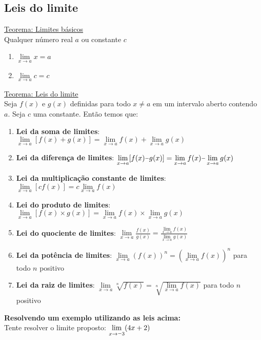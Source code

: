 \documentclass[12pt,a4paper,brazil]{article}
\newcommand{\minus}{\scalebox{0.75}[1.0]{$-$}}
\begin{document}
\subsection{\textbf{Leis do limite}}
\underline{Teorema: Limites básicos} \\
Qualquer número real $a$ ou constante $c$
\begin{center}
	\begin{enumerate}
		\item $\lim\limits_{x \to a} x = a$
		\item $\lim\limits_{x \to a} c = c$
	\end{enumerate}
\end{center}
\underline{Teorema: Leis do limite} \\
Seja $f(x)$ e $g(x)$ definidas para todo $x \neq a$ em um intervalo aberto contendo $a$.
Seja $c$ uma constante. Então temos que:
\begin{center}
	\begin{enumerate}
		\item \textbf{Lei da soma de limites}:
			$\lim\limits_{x \to a} [f(x) + g(x)] = \lim\limits_{x \to a} f(x) + \lim\limits_{x \to a} g(x)$
		\item \textbf{Lei da diferença de limites}:
			$\lim\limits_{x \to a} [f(x) \minus g(x)] = \lim\limits_{x \to a} f(x) \minus \lim\limits_{x \to a} g(x)$
		\item \textbf{Lei da multiplicação constante de limites}:
			$\lim\limits_{x \to a} [c f(x)] = c \lim\limits_{x \to a} f(x)$
		\item \textbf{Lei do produto de limites}:
			$\lim\limits_{x \to a} [f(x) \times g(x)] = \lim\limits_{x \to a} f(x) \times \lim\limits_{x \to a} g(x)$
		\item \textbf{Lei do quociente de limites}:
			$\lim\limits_{x \to a} \frac{f(x)}{g(x)} = \frac{\lim\limits_{x \to a} f(x)}{\lim\limits_{x \to a} g(x)}$
		\item \textbf{Lei da potência de limites}:
			$\lim\limits_{x \to a} (f(x))^n = (\lim\limits_{x \to a} f(x))^n$ para todo $n$ positivo
		\item \textbf{Lei da raiz de limites}:
			$\lim\limits_{x \to a} \sqrt[n]{f(x)} = \sqrt[n]{\lim\limits_{x \to a} f(x)}$ para todo $n$ positivo
	\end{enumerate}
\end{center}
\textbf{Resolvendo um exemplo utilizando as leis acima:} \\
Tente resolver o limite proposto: $\lim\limits_{x \to \minus3} (4x + 2)$ \\
\end{document}
